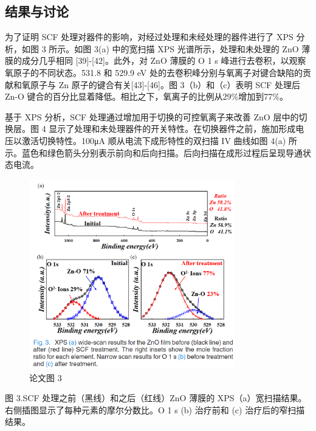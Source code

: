 \subsection{结果与讨论}

为了证明 SCF 处理对器件的影响，对经过处理和未经处理的器件进行了 XPS 分析，如图 3 所示。如图 3(a) 中的宽扫描 XPS 光谱所示，处理和未处理的 ZnO 薄膜的成分几乎相同 [39]-[42]。此外，对 ZnO 薄膜的 O 1 s 峰进行去卷积，以观察氧原子的不同状态。531.8 和 529.9 eV 处的去卷积峰分别与氧离子对键合缺陷的贡献和氧原子与 Zn 原子的键合有关[43]-[46]。图 3（b）和（c）表明 SCF 处理后 Zn-O 键合的百分比显着降低。相比之下，氧离子的比例从29\%增加到77\%。

基于 XPS 分析，SCF 处理通过增加用于切换的可控氧离子来改善 ZnO 层中的切换层。图 4 显示了处理和未处理器件的开关特性。在切换器件之前，施加形成电压以激活切换特性。100μA 顺从电流下成形特性的双扫描 IV 曲线如图 4(a) 所示。蓝色和绿色箭头分别表示前向和后向扫描。后向扫描在成形过程后呈现导通状态电流。

\begin{figure}[htb]
\centering 
\includegraphics[width=0.80\textwidth]{img/c1m3.png} 
\caption{论文图 3}
\label{Test}
\end{figure}

图 3.SCF 处理之前（黑线）和之后（红线）ZnO 薄膜的 XPS（a）宽扫描结果。右侧插图显示了每种元素的摩尔分数比。O 1 s (b) 治疗前和 (c) 治疗后的窄扫描结果。



